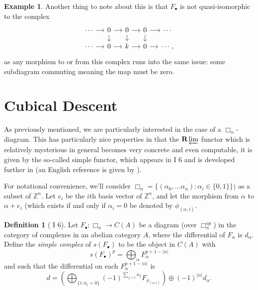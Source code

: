 \documentclass{report}
\theoremstyle{definition}
\newtheorem{definition}[theorem]{Definition}
\newtheorem{example}[theorem]{Example}
\newcommand{\bR}{\textbf{R}}
\newcommand{\ZZ}{\mathbb{Z}}
\begin{document}
\begin{example}
	Another thing to note about this is that $F_\bullet$ is not quasi-isomorphic to the complex 
	\[
	\begin{tikzcd}[column sep = small, row sep = small]
	\cdots \ar[r] &  0 \ar[r] \ar[d] & 0 \ar{r} \ar{d} & 0 \ar[r] \ar[d] & \cdots \\
	\cdots \ar[r] & 0 \ar[r] & k \ar[r] & 0 \ar[r] & \cdots,
	\end{tikzcd}
	\]
	as any morphism to or from this complex runs into the same issue: some subdiagram commuting meaning the map must be zero.
\end{example}
	
\section{Cubical Descent}
\label{sec:cubicaldescent}

As previously mentioned, we are particularly interested in the case of a $\Box_n$-diagram.
This has particularly nice properties in that the $\bR \varprojlim$ functor which is relatively mysterious in general becomes very concrete and even computable, it is given by the so-called simple functor, which appears in \cite{Guillen1988} I 6 and is developed further in \cite{Guillen2002} (an English reference is given by \cite{Pascual2009}).

For notational convenience, we'll consider $\Box_n = \{(\alpha_0, \dots \alpha_n) : \alpha_i \in \{0, 1\}\})$ as a subset of $\ZZ^n$.
Let $e_i$ be the $i$th basis vector of $\ZZ^n$, and let the morphism from $\alpha$ to $\alpha + e_i$ (which exists if and only if $\alpha_i = 0$ be denoted by $\phi_{(\alpha, i)}$.

\begin{definition}[\cite{Guillen1988} I 6]
	Let $F_\bullet : \Box_n \rightarrow C(A)$ be a diagram (over $\Box_n^{op}$) in the category of complexes in an abelian category $A$, where the differential of $F_\alpha$ is $d_\alpha$.
	Define the {\it simple complex} of $s(F_\bullet)$ to be the object in $C(A)$ with
	\[
	s(F_\bullet)^p = \bigoplus_\alpha F_\alpha^{p+1-|\alpha|}
	\] 
	and such that the differential on each $F_\alpha^{p+1-|\alpha|}$ is
	\[
	d = (\bigoplus_{\{i : \alpha_i = 0\}} (-1)^{\sum_{j < i} \alpha_j} F_{\phi_{(\alpha, i)}}) \oplus (-1)^{|\alpha|} d_\alpha.
	\]
\end{definition}
\end{document}
